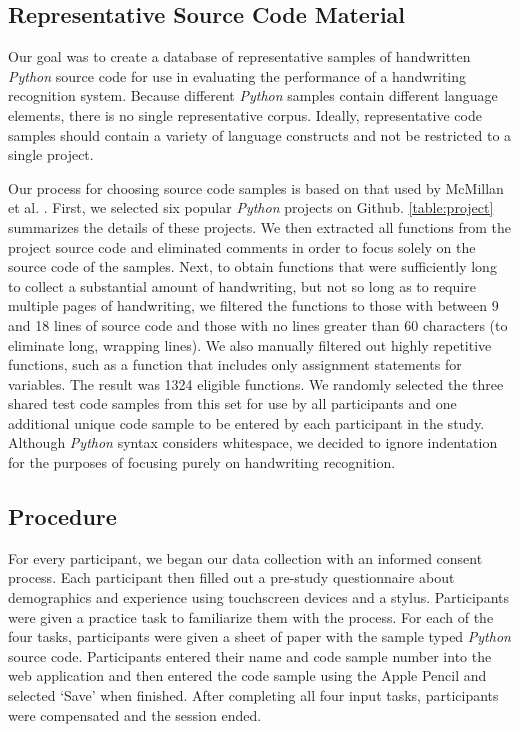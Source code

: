 \documentclass{vgtc}                          %
\begin{document}
\subsection{Representative Source Code Material}
Our goal was to create a database of representative samples of handwritten \textit{Python} source code for use in evaluating the performance of a handwriting recognition system. Because different \textit{Python} samples contain different language elements, there is no single representative corpus\cite{almusaly2015syntax}. Ideally, representative code samples should contain a variety of language constructs and not be restricted to a single project. 

Our process for choosing source code samples is based on that used by McMillan et al. \cite{mcmillan2012exemplar, rodeghero2014improving}. First, we selected six popular \textit{Python} projects on Github. \autoref{table:project} summarizes the details of these projects. We then extracted all functions from the project source code and eliminated comments in order to focus solely on the source code of the samples.  Next, to obtain functions that were sufficiently long to collect a substantial amount of handwriting, but not so long as to require multiple pages of handwriting, we filtered the functions to those with between 9 and 18 lines of source code and those with no lines greater than 60 characters (to eliminate long, wrapping lines).  We also manually filtered out highly repetitive functions, such as a function that includes only assignment statements for variables. The result was 1324 eligible functions. We randomly selected the three shared test code samples from this set for use by all participants and one additional unique code sample to be entered by each participant in the study. Although \textit{Python} syntax considers whitespace, we decided to ignore indentation for the purposes of focusing purely on handwriting recognition. 




\subsection{Procedure}

For every participant, we began our data collection with an informed consent process.  Each participant then filled out a pre-study questionnaire about demographics and experience using touchscreen devices and a stylus. Participants were given a practice task to familiarize them with the process.  For each of the four tasks, participants were given a sheet of paper with the sample typed \textit{Python} source code.   Participants entered their name and code sample number into the web application and then entered the code sample using the Apple Pencil and selected `Save' when finished.  After completing all four input tasks, participants were compensated and the session ended.
\end{document}
